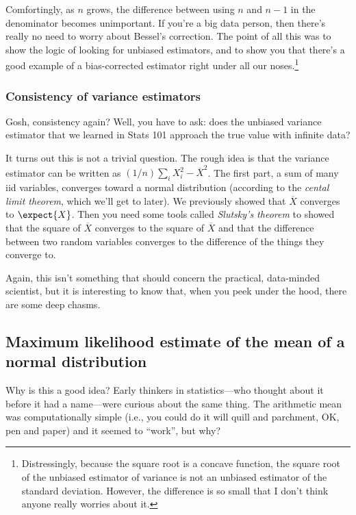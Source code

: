 Comfortingly, as $n$ grows, the difference between using $n$ and $n-1$ in the
denominator becomes unimportant. If you're a big data person, then there's
really no need to worry about Bessel's correction. The point of all this was
to show the logic of looking for unbiased estimators, and to show you that
there's a good example of a bias-corrected estimator right under all our
noses.\footnote{Distressingly, because the square root is a concave function,
the square root of the unbiased estimator of variance is not an unbiased
estimator of the standard deviation. However, the difference is so small that
I don't think anyone really worries about it.}

\subsubsection{Consistency of variance estimators}

Gosh, consistency again? Well, you have to ask: does the unbiased variance
estimator that we learned in Stats 101 approach the true value with infinite
data?

It turns out this is not a trivial question. The rough idea is that the
variance estimator can be written as $(1/n) \sum_i X_i^2 - \overline{X}^2$.
The first part, a sum of many iid variables, converges toward a normal
distribution (according to the \emph{cental limit theorem}, which we'll get to
later). We previously showed that $\overline{X}$ converges to $\expect{X}$.
Then you need some tools called \emph{Slutsky's theorem} to showed that the
square of $\overline{X}$ converges to the square of $\overline{X}$ and that
the difference between two random variables converges to the difference of the
things they converge to.

Again, this isn't something that should concern the practical, data-minded
scientist, but it is interesting to know that, when you peek under the hood,
there are some deep chasms.

\subsection{Maximum likelihood estimate of the mean of a normal distribution}

Why is this a good idea? Early thinkers in statistics---who thought
about it before it had a name---were curious about the same thing. The
arithmetic mean was computationally simple (i.e., you could do it will
quill and parchment, OK, pen and paper) and it seemed to ``work'', but
why?

